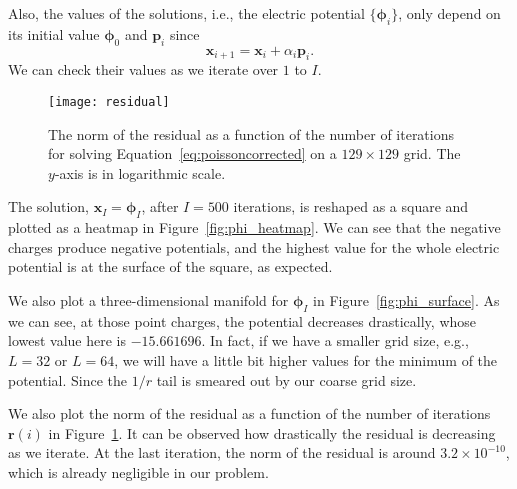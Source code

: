 Also, the values of the solutions, i.e., the electric potential \(\{\bm{\phi}_i\}\),
only depend on its initial value \(\bm{\phi}_0\) and \(\bm{p}_i\) since
%
\begin{equation}
    \bm{x}_{i+1} = \bm{x}_i + \alpha_i \bm{p}_i.
\end{equation}
%
We can check their values as we iterate over \(1\) to \(I\).

\begin{figure}[!hbt]
    \centering
    \texttt{[image: residual]}
    \caption{The norm of the residual as a function of the number of iterations for solving
        Equation~\eqref{eq:poissoncorrected} on a \(129 \times 129\) grid.
        The \(y\)-axis is in logarithmic scale.}
    \label{fig:residual}
\end{figure}

The solution, \(\bm{x}_I = \bm{\phi}_I\), after \(I=500\) iterations, is reshaped
as a square and plotted as a heatmap in Figure~\ref{fig:phi_heatmap}.
We can see that the negative charges produce negative potentials,
and the highest value for the whole electric potential is at the surface
of the square, as expected.

We also plot a three-dimensional manifold for \(\bm{\phi}_I\)
in Figure~\ref{fig:phi_surface}.
As we can see, at those point charges, the potential decreases drastically,
whose lowest value here is \(-15.661696\).
In fact, if we have a smaller grid size, e.g., \(L = 32\) or \(L = 64\),
we will have a little bit higher values for the minimum of the potential.
Since the \(1 / r\) tail is smeared out by our coarse grid size.

We also plot the norm of the residual as a function of the number of iterations
\(\bm{r}(i)\) in Figure~\ref{fig:residual}. It can be observed how drastically
the residual is decreasing as we iterate.
At the last iteration, the norm of the residual is around \(3.2 \times 10^{-10}\),
which is already negligible in our problem.
